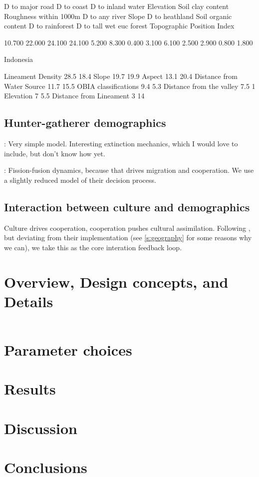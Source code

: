 \documentclass[a4paper,12pt]{scrartcl}
\begin{document}
D to major road
D to coast
D to inland water
Elevation
Soil clay content
Roughness within 1000m
D to any river
Slope
D to heathland
Soil organic content
D to rainforest
D to tall wet euc forest
Topographic Position Index

10.700
22.000
24.100
24.100
5.200
8.300
0.400
3.100
6.100
2.500
2.900
0.800
1.800

\cite{muttaqin2019maxent}
Indonesia

Lineament Density 28.5 18.4
Slope 19.7 19.9 
Aspect 13.1 20.4
Distance from Water Source 11.7 15.5 
OBIA classifications 9.4 5.3
Distance from the valley 7.5 1
Elevation 7 5.5
Distance from Lineament 3 14
\subsection{Hunter-gatherer demographics}
\label{s:demographics}

\textcite{hamilton2018stochastic}: Very simple model. Interesting extinction
mechanics, which I would love to include, but don't know how yet.

\textcite{crema2014simulation}: Fission-fusion dynamics, because that drives
migration and cooperation. We use a slightly reduced model of their decision
process.

\subsection{Interaction between culture and demographics}
\label{s:interaction}

Culture drives cooperation, cooperation pushes cultural assimilation. Following
\parencite{barcelo2014social,barcelo2015simulating}, but deviating from their
implementation (see \cref{s:geography} for some reasons why we can), we take this
as the core interation feedback loop.

\section{Overview, Design concepts, and Details}
\label{s:odd}

\inputminted{rust}{supplement/dispersal_model_rust/src/main.rs}
\section{Parameter choices}
\label{s:parameters}
\section{Results}
\label{s:results}
\section{Discussion}
\label{s:discussion}
\section{Conclusions}
\label{s:conclusions}

\printbibliography
\end{document}
